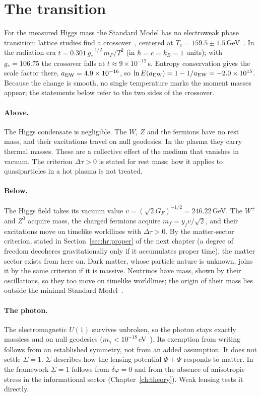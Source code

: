 \section{The transition}\label{sec:ew:transition}
For the measured Higgs mass the Standard Model has no electroweak phase transition: lattice studies find a crossover~\cite{Kajantie1996}, centered at
$T_c=159.5\pm1.5$\,GeV~\cite{DOnofrio2016}. \observed{} In the radiation era $t=0.301\,g_*^{-1/2}\,m_P/T^2$ (in $\hbar=c=k_B=1$ units); with
$g_*=106.75$ the crossover falls at $t\approx9\times10^{-12}$\,s. Entropy conservation gives the scale factor there, $a_{\rm EW}=4.9\times10^{-16}$,
so $\ln E(a_{\rm EW})=1-1/a_{\rm EW}=-2.0\times10^{15}$. \calc{} Because the change is smooth, no single temperature marks the moment masses appear;
the statements below refer to the two sides of the crossover.

\paragraph{Above.} The Higgs condensate is negligible. The $W$, $Z$ and the fermions have no rest mass, and their excitations travel on null
geodesics. In the plasma they carry thermal masses. These are a collective effect of the medium that vanishes in vacuum. The criterion
$\Delta\tau>0$ is stated for rest mass; how it applies to quasiparticles in a hot plasma is not treated. \openprob

\paragraph{Below.} The Higgs field takes its vacuum value $v=(\sqrt2G_F)^{-1/2}=246.22$\,GeV. \calc{} The $W^\pm$ and $Z^0$ acquire mass, the charged
fermions acquire $m_f=y_fv/\sqrt2$, and their excitations move on timelike worldlines with $\Delta\tau>0$. By the matter-sector criterion, stated in
Section~\ref{sec:hr:proper} of the next chapter (a degree of freedom decoheres gravitationally only if it accumulates proper time), the matter sector exists from here on. Dark matter, whose particle nature is unknown, joins it by the same criterion if it
is massive. Neutrinos have mass, shown by their oscillations, so they too move on timelike worldlines; the origin of their mass lies outside the
minimal Standard Model~\cite{PDG2022}. \observed

\paragraph{The photon.} The electromagnetic $U(1)$ survives unbroken, so the photon stays exactly massless and on null geodesics
($m_\gamma<10^{-18}$\,eV~\cite{PDG2024}). Its exemption from writing follows from an established symmetry, not from an added assumption. \derived{}
It does not settle $\Sigma=1$. $\Sigma$ describes how the lensing potential $\Phi+\Psi$ responds to matter. In the framework $\Sigma=1$ follows from
$\delta\varphi=0$ and from the absence of anisotropic stress in the informational sector (Chapter~\ref{ch:theory}). Weak lensing tests it directly.

